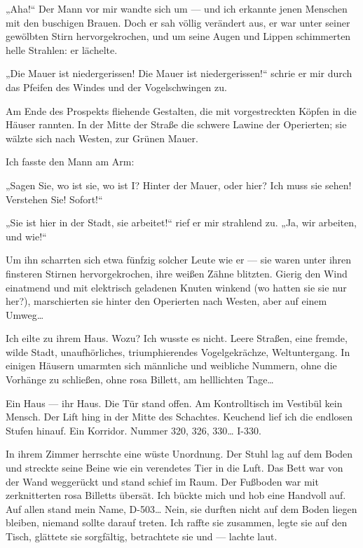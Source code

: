 „Aha!“ Der Mann vor mir wandte sich um — und ich erkannte jenen
Menschen mit den buschigen Brauen. Doch er sah völlig verändert
aus, er war unter seiner gewölbten Stirn hervorgekrochen, und um
seine Augen und Lippen schimmerten helle Strahlen: er lächelte.

„Die Mauer ist niedergerissen! Die Mauer ist niedergerissen!“
schrie er mir durch das Pfeifen des Windes und der Vogelschwingen
zu.

Am Ende des Prospekts fliehende Gestalten, die mit vorgestreckten
Köpfen in die Häuser rannten. In der Mitte der Straße die schwere
Lawine der Operierten; sie wälzte sich nach Westen, zur Grünen
Mauer.

Ich fasste den Mann am Arm:

„Sagen Sie, wo ist sie, wo ist I? Hinter der Mauer, oder hier? Ich
muss sie sehen! Verstehen Sie! Sofort!“

„Sie ist hier in der Stadt,
sie arbeitet!“ rief er mir strahlend zu. „Ja, wir arbeiten, und
wie!“

Um ihn scharrten sich etwa fünfzig solcher Leute wie er — sie
waren unter ihren finsteren Stirnen hervorgekrochen, ihre weißen
Zähne blitzten. Gierig den Wind einatmend und mit elektrisch
geladenen Knuten winkend
(wo hatten sie sie nur her?), marschierten sie hinter den
Operierten nach Westen, aber auf einem Umweg\ldots{}

Ich eilte zu ihrem
Haus. Wozu? Ich wusste es nicht. Leere Straßen, eine fremde, wilde
Stadt, unaufhörliches, triumphierendes Vogelgekrächze,
Weltuntergang. In einigen Häusern umarmten sich männliche und
weibliche Nummern, ohne die Vorhänge zu schließen, ohne rosa
Billett, am helllichten Tage\ldots{}

Ein Haus — ihr Haus. Die Tür stand offen. Am Kontrolltisch im
Vestibül kein Mensch. Der Lift hing in der Mitte des Schachtes.
Keuchend lief ich die endlosen Stufen hinauf. Ein Korridor. Nummer
320, 326, 330\ldots{} I-330.

In ihrem Zimmer herrschte eine wüste
Unordnung. Der Stuhl lag auf dem Boden und streckte seine Beine wie
ein verendetes Tier in die Luft. Das Bett war von der Wand
weggerückt und stand schief im Raum. Der Fußboden war mit
zerknitterten rosa Billetts übersät. Ich bückte mich und hob eine
Handvoll auf. Auf allen stand mein Name, D-503\ldots{} Nein, sie durften
nicht auf dem Boden liegen bleiben, niemand sollte darauf treten.
Ich raffte sie zusammen, legte sie auf den Tisch, glättete sie
sorgfältig, betrachtete sie und — lachte laut.

